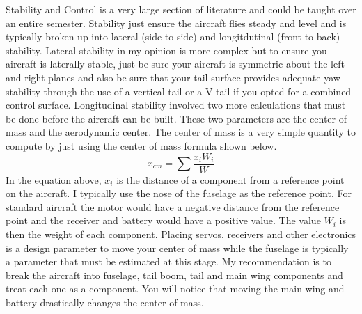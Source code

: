 \documentclass{article}
\begin{document}
Stability and Control is a very large section of literature and could
be taught over an entire semester. Stability just ensure the aircraft
flies steady and level and is typically broken up into lateral (side
to side) and longitdutinal (front to back) stability. Lateral
stability in my opinion is more complex but to ensure you aircraft is
laterally stable, just be sure your aircraft is symmetric about the
left and right planes and also be sure that your tail surface provides
adequate yaw stability through the use of a vertical tail or a V-tail
if you opted for a combined control surface. Longitudinal stability
involved two more calculations that must be done before the aircraft
can be built. These two parameters are the center of mass and the
aerodynamic center. The center of mass is a very simple quantity to
compute by just using the center of mass formula shown below.
\begin{equation}
x_{cm} = \sum\frac{x_iW_i}{W}
\end{equation}
In the equation above, $x_i$ is the distance of a component from a
reference point on the aircraft. I typically use the nose of the
fuselage as the reference point. For standard aircraft the motor would
have a negative distance from the reference point and the receiver and
battery would have a positive value. The value $W_i$ is then the
weight of each component. Placing servos, receivers and other
electronics is a design parameter to move your center of mass while
the fuselage is typically a parameter that must be estimated at this
stage. My recommendation is to break the aircraft into fuselage, tail
boom, tail and main wing components and treat each one as a
component. You will notice that moving the main wing and battery
drastically changes the center of mass.
\end{document}
